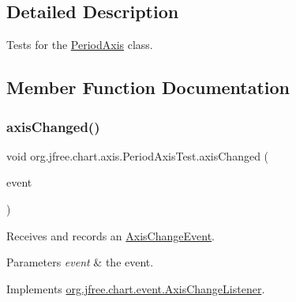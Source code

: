 \subsection{Detailed Description}
Tests for the \mbox{\hyperlink{classorg_1_1jfree_1_1chart_1_1axis_1_1_period_axis}{Period\+Axis}} class. 

\subsection{Member Function Documentation}
\mbox{\label{classorg_1_1jfree_1_1chart_1_1axis_1_1_period_axis_test_a951dc996bd0b09bd930878a5e2041cad}} 
\subsubsection{\texorpdfstring{axis\+Changed()}{axisChanged()}}
{\footnotesize\ttfamily void org.\+jfree.\+chart.\+axis.\+Period\+Axis\+Test.\+axis\+Changed (\begin{DoxyParamCaption}\item[{\mbox{\hyperlink{classorg_1_1jfree_1_1chart_1_1event_1_1_axis_change_event}{Axis\+Change\+Event}}}]{event }\end{DoxyParamCaption})}

Receives and records an \mbox{\hyperlink{}{Axis\+Change\+Event}}.


\begin{DoxyParams}{Parameters}
{\em event} & the event. \\
\hline
\end{DoxyParams}


Implements \mbox{\hyperlink{interfaceorg_1_1jfree_1_1chart_1_1event_1_1_axis_change_listener_a0598d6b49c0ec1aff38fe39d34297b87}{org.\+jfree.\+chart.\+event.\+Axis\+Change\+Listener}}.

\mbox{\label{classorg_1_1jfree_1_1chart_1_1axis_1_1_period_axis_test_a3fbfdadadb8f0b87f73a911d3ca342a3}} 
